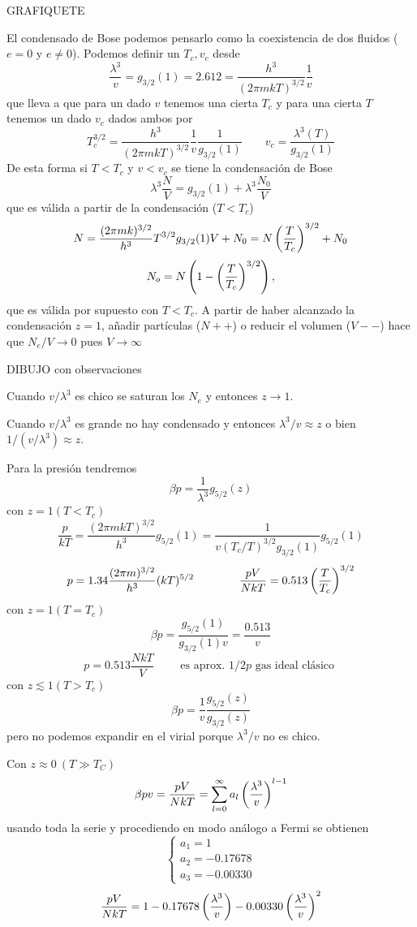 \documentclass[10pt,oneside]{CBFT_book}
\begin{document}
GRAFIQUETE

El condensado de Bose podemos pensarlo como la coexistencia de dos fluidos ($e=0$ y $e\neq 0$).
Podemos definir un $ T_c, v_c $ desde 
\[
	\frac{\lambda^3}{v} = g_{3/2}(1) = 2.612 = \frac{h^3}{(2 \pi m k T)^{3/2}} \frac{1}{v}
\]
que lleva a que para un dado $v$ tenemos una cierta $T_c$ y para una cierta $T$ tenemos un 
dado $v_c$ dados ambos por 
\[
	T_c^{3/2} = \frac{h^3}{(2 \pi m k T)^{3/2}} \frac{1}{v} \frac{1}{g_{3/2}(1)} \qquad 
	v_c = \frac{\lambda^3(T)}{g_{3/2}(1)}
\]
De esta forma si $ T<T_c$ y $v<v_c$ se tiene la condensación de Bose
\[
	\lambda^3\frac{N}{V} = g_{3/2}(1) + \lambda^3\frac{N_0}{V}
\]
que es válida a partir de la condensación ($T<T_c$)
\[
	N =  \frac{(2 \pi m k )^{3/2}}{h^3} T^{3/2} g_{3/2}(1)  V + N_0 = N \left( \frac{ T }{ T_c } \right)^{3/2} + N_0
\]
\[
	N_o = N \left( 1 - \left( \frac{ T }{ T_c } \right)^{3/2} \right),
\]
que es válida por supuesto con $T<T_c$.
A partir de haber alcanzado la condensación $z=1$, añadir partículas ($N++$) o reducir el volumen 
($V--$) hace que $N_e/V \to 0 $ pues $V \to \infty$

DIBUJO con observaciones

Cuando $v/\lambda^3$ es chico se saturan los $N_e$ y entonces $ z \to 1 $.

Cuando $v/\lambda^3$ es grande no hay condensado y entonces $ \lambda^3/v \approx z $ o bien
$ 1/ (v/\lambda^3) \approx z $.

Para la presión tendremos
\[
	\beta p = \frac{1}{\lambda^3} g_{5/2}(z)
\]
con $ z = 1 ( T < T_c ) $
\[
	\frac{p}{kT} = \frac{(2\pi m k T)^{3/2}}{h^3} g_{5/2}(1) = 
	\frac{1}{ v (T_c/T)^{3/2} g_{3/2}(1) } g_{5/2}(1)
\]
\[
	p = 1.34 \frac{(2\pi m )^{3/2}}{h^3} (kT)^{5/2} \qquad \qquad 
	\frac{pV}{NkT} = 0.513 \left( \frac{ T }{ T_c } \right)^{3/2}
\]
con $ z = 1 ( T = T_c ) $
\[
	\beta p = \frac{ g_{5/2}(1) }{ g_{3/2}(1) v } = \frac{0.513}{v}
\]
\[
	p = 0.513 \frac{NkT}{V} \qquad \text{ es aprox. $1/2 p$ gas ideal clásico }
\]
con $ z \lesssim 1 ( T > T_c ) $
\[
	\beta p = \frac{1}{v} \frac{ g_{5/2}(z) }{ g_{3/2}(z) }
\]
pero no podemos expandir en el virial porque $ \lambda^3 / v $ no es chico.

Con $ z \approx 0 \: ( T \gg T_C ) $
\[
	\beta p v = \frac{pV}{NkT} = \sum_{l=0}^\infty a_l \left( \frac{ \lambda^3 }{ v } \right)^{l-1}
\]
usando toda la serie y procediendo en modo análogo a Fermi se obtienen
\[
	\begin{cases}
	 a_1 = 1 \\
	 a_2 = -0.17678 \\
	 a_3 = -0.00330
	\end{cases}
\]
\[
	\frac{pV}{NkT} = 1 - 0.17678 \left( \frac{ \lambda^3 }{ v } \right) - 0.00330 \left( \frac{ \lambda^3 }{ v } \right)^2
\]
\end{document}
